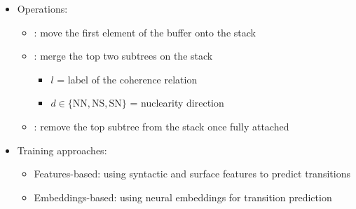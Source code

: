 \documentclass[xcolor=table]{beamer}
\begin{document}
\begin{frame}
	\begin{itemize}
		\item Operations:
		\begin{itemize}
			\item {}: move the first element of the buffer onto the stack
			\item {}: merge the top two subtrees on the stack
			\begin{itemize}
				\item $l$ = label of the coherence relation
				\item $d \in \{\text{NN}, \text{NS}, \text{SN}\}$ = nuclearity direction
			\end{itemize}
			\item {}: remove the top subtree from the stack once fully attached
		\end{itemize}
		\item Training approaches:
		\begin{itemize}
			\item Features-based: using syntactic and surface features to predict transitions
			\item Embeddings-based: using neural embeddings for transition prediction
		\end{itemize}
	\end{itemize}
	
\end{frame}
\end{document}
